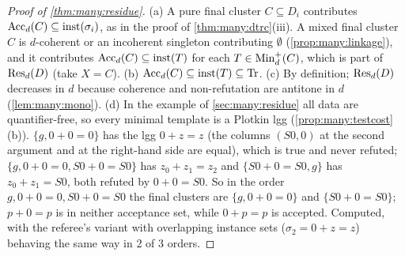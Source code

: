 \begin{proof}[Proof of \cref{thm:many:residue}]
(a) A pure final cluster $C\subseteq D_i$ contributes $\mathrm{Acc}_d(C)\subseteq\mathrm{inst}(\sigma_i)$, as in the proof of
\cref{thm:many:dtrc}(iii). A mixed final cluster $C$ is $d$-coherent or an incoherent singleton contributing $\emptyset$
(\cref{prop:many:linkage}), and it contributes $\mathrm{Acc}_d(C)\subseteq\mathrm{inst}(T)$ for each $T\in\mathrm{Min}_d^+(C)$, which is part of
$\mathrm{Res}_d(D)$ (take $X=C$). (b) $\mathrm{Acc}_d(C)\subseteq\mathrm{inst}(T)\subseteq\mathrm{Tr}$. (c) By definition; $\mathrm{Res}_d(D)$ decreases in $d$
because coherence and non-refutation are antitone in $d$ (\cref{lem:many:mono}). (d) In the example of \cref{sec:many:residue}
all data are quantifier-free, so every minimal template is a Plotkin lgg (\cref{prop:many:testcost}(b)). $\{g,0+0=0\}$ has
the lgg $0+z=z$ (the columns $(S0,0)$ at the second argument and at the right-hand side are equal), which is true and never
refuted; $\{g,0+0=0,S0+0=S0\}$ has $z_0+z_1=z_2$ and $\{S0+0=S0,g\}$ has $z_0+z_1=S0$, both refuted by $0+0=S0$. So in the
order $g,0+0=0,S0+0=S0$ the final clusters are $\{g,0+0=0\}$ and $\{S0+0=S0\}$; $p+0=p$ is in neither acceptance set,
while $0+p=p$ is accepted. Computed, with the referee's variant with overlapping instance sets
($\sigma_2=0+z=z$) behaving the same way in 2 of 3 orders.
\end{proof}


